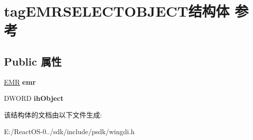 \hypertarget{structtag_e_m_r_s_e_l_e_c_t_o_b_j_e_c_t}{}\section{tag\+E\+M\+R\+S\+E\+L\+E\+C\+T\+O\+B\+J\+E\+C\+T结构体 参考}
\label{structtag_e_m_r_s_e_l_e_c_t_o_b_j_e_c_t}
\subsection*{Public 属性}
\begin{DoxyCompactItemize}
\item 
\mbox{\label{structtag_e_m_r_s_e_l_e_c_t_o_b_j_e_c_t_a12f2a5e04d035ba11edfe9a65c383172}} 
\hyperlink{structtag_e_m_r}{E\+MR} {\bfseries emr}
\item 
\mbox{\label{structtag_e_m_r_s_e_l_e_c_t_o_b_j_e_c_t_aedf39f50eae56d99be44a58324d7a1ad}} 
D\+W\+O\+RD {\bfseries ih\+Object}
\end{DoxyCompactItemize}


该结构体的文档由以下文件生成\+:\begin{DoxyCompactItemize}
\item 
E\+:/\+React\+O\+S-\/0../sdk/include/psdk/wingdi.\+h\end{DoxyCompactItemize}
